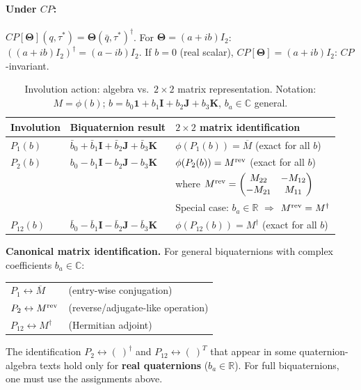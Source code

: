 \documentclass[12pt,a4paper]{article}
\theoremstyle{definition}
\theoremstyle{remark}
\begin{document}
\paragraph{Under $CP$:}
$CP[\mathbf{\Theta}](q,\tau^*) = \mathbf{\Theta}(\bar q,\tau^*)^\dagger$.
For $\mathbf{\Theta} = (a+ib)I_2$: $((a+ib)I_2)^\dagger = (a-ib)I_2$.
If $b=0$ (real scalar), $CP[\mathbf{\Theta}] = (a+ib)I_2$: $CP$-invariant. \checkmark

\begin{table}[h]
\centering
\caption{Involution action: algebra vs.\ $2\times2$ matrix representation.
  Notation: $M = \phi(b)$; $b = b_0\mathbf{1} + b_1\mathbf{I} + b_2\mathbf{J} + b_3\mathbf{K}$,
  $b_a\in\mathbb{C}$ general.}
\label{tab:mat:check}
\begin{tabular}{@{}lll@{}}
\toprule
Involution & Biquaternion result & $2\times2$ matrix identification \\
\midrule
$P_1(b)$ & $\bar b_0 + \bar b_1\mathbf{I} + \bar b_2\mathbf{J} + \bar b_3\mathbf{K}$
  & $\phi(P_1(b)) = \overline{M}$ \quad (exact for all $b$) \\
$P_2(b)$ & $b_0 - b_1\mathbf{I} - b_2\mathbf{J} - b_3\mathbf{K}$
  & $\phi(P_2(b)) = M^{\rm rev}$ \quad (exact for all $b$)\\
  & & \small{where $M^{\rm rev} = \begin{pmatrix}M_{22} & -M_{12}\\-M_{21} & M_{11}\end{pmatrix}$}\\
  & & \small{Special case: $b_a\in\mathbb{R}$ $\Rightarrow$ $M^{\rm rev} = M^\dagger$} \\
$P_{12}(b)$ & $\bar b_0 - \bar b_1\mathbf{I} - \bar b_2\mathbf{J} - \bar b_3\mathbf{K}$
  & $\phi(P_{12}(b)) = M^\dagger$ \quad (exact for all $b$) \\
\bottomrule
\end{tabular}
\end{table}

\begin{insightbox}
\textbf{Canonical matrix identification.}
For general biquaternions with complex coefficients $b_a\in\mathbb{C}$:
\begin{center}
\begin{tabular}{ll}
$P_1 \leftrightarrow \overline{M}$ & (entry-wise conjugation) \\
$P_2 \leftrightarrow M^{\rm rev}$ & (reverse/adjugate-like operation) \\
$P_{12} \leftrightarrow M^\dagger$ & (Hermitian adjoint) \\
\end{tabular}
\end{center}
The identification $P_2\leftrightarrow(\ )^\dagger$ and
$P_{12}\leftrightarrow(\ )^T$ that appear in some quaternion-algebra texts
hold only for \textbf{real quaternions} ($b_a\in\mathbb{R}$).
For full biquaternions, one must use the assignments above.
\end{insightbox}
\end{document}
